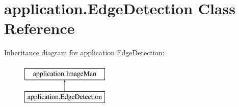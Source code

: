 \hypertarget{classapplication_1_1_edge_detection}{}\section{application.\+Edge\+Detection Class Reference}
\label{classapplication_1_1_edge_detection}
Inheritance diagram for application.\+Edge\+Detection\+:\begin{figure}[H]
\begin{center}
\leavevmode
\includegraphics[height=2.000000cm]{classapplication_1_1_edge_detection}
\end{center}
\end{figure}
